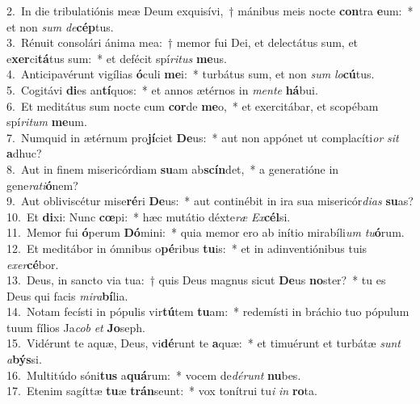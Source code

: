 {2.~}In die tribulatiónis meæ Deum exquisívi,~† mánibus meis nocte \textbf{con}tra \textbf{e}um:~* et non \textit{sum} \textit{de}\textbf{cép}tus.\\
{3.~}Rénuit consolári ánima mea:~† memor fui Dei, et delectátus sum, et e\textbf{xer}ci\textbf{tá}tus sum:~* et defécit spí\textit{ri}\textit{tus} \textbf{me}us.\\
{4.~}Anticipavérunt vigílias \textbf{ó}culi \textbf{me}i:~* turbátus sum, et non \textit{sum} \textit{lo}\textbf{cú}tus.\\
{5.~}Cogitávi \textbf{di}es an\textbf{tí}quos:~* et annos ætérnos in \textit{men}\textit{te} \textbf{há}bui.\\
{6.~}Et meditátus sum nocte cum \textbf{cor}de \textbf{me}o,~* et exercitábar, et scopébam spí\textit{ri}\textit{tum} \textbf{me}um.\\
{7.~}Numquid in ætérnum pro\textbf{jí}ciet \textbf{De}us:~* aut non appónet ut complacíti\textit{or} \textit{sit} \textbf{a}dhuc?\\
{8.~}Aut in finem misericórdiam \textbf{su}am ab\textbf{scín}det,~* a generatióne in gene\textit{ra}\textit{ti}\textbf{ó}nem?\\
{9.~}Aut obliviscétur mise\textbf{ré}ri \textbf{De}us:~* aut continébit in ira sua misericór\textit{di}\textit{as} \textbf{su}as?\\
{10.~}Et \textbf{di}xi: Nunc \textbf{cœ}pi:~* hæc mutátio déxte\textit{ræ} \textit{Ex}\textbf{cél}si.\\
{11.~}Memor fui \textbf{ó}perum \textbf{Dó}mini:~* quia memor ero ab inítio mirabíli\textit{um} \textit{tu}\textbf{ó}rum.\\
{12.~}Et meditábor in ómnibus o\textbf{pé}ribus \textbf{tu}is:~* et in adinventiónibus tuis \textit{e}\textit{xer}\textbf{cé}bor.\\
{13.~}Deus, in sancto via tua:~† quis Deus magnus sicut \textbf{De}us \textbf{no}ster?~* tu es Deus qui facis \textit{mi}\textit{ra}\textbf{bí}lia.\\
{14.~}Notam fecísti in pópulis vir\textbf{tú}tem \textbf{tu}am:~* redemísti in bráchio tuo pópulum tuum fílios Ja\textit{cob} \textit{et} \textbf{Jo}seph.\\
{15.~}Vidérunt te aquæ, Deus, vi\textbf{dé}runt te \textbf{a}quæ:~* et timuérunt et turbátæ \textit{sunt} \textit{a}\textbf{býs}si.\\
{16.~}Multitúdo sóni\textbf{tus} a\textbf{quá}rum:~* vocem de\textit{dé}\textit{runt} \textbf{nu}bes.\\
{17.~}Etenim sagíttæ \textbf{tu}æ \textbf{trán}seunt:~* vox tonítrui tu\textit{i} \textit{in} \textbf{ro}ta.\\
